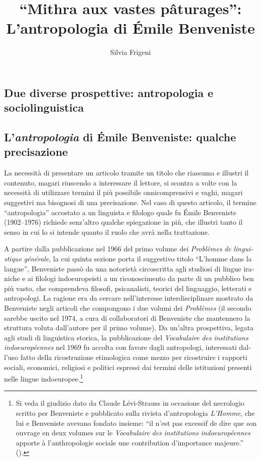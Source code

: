 \documentclass[french,output=paper,colorlinks,citecolor=brown]{../langscibook}
\author{Silvia Frigeni\affiliation{Sapienza Università di Roma, Université Sorbonne Nouvelle -- Paris 3}\orcid{}}
\title{“Mithra aux vastes pâturages”: L’antropologia di Émile Benveniste}
\begin{document}
\begin{otherlanguage}{italian}
\maketitle

\section{Due diverse prospettive: antropologia e sociolinguistica} 

\subsection{L’\textit{antropologia} di Émile Benveniste: qualche precisazione}

La necessità di presentare un articolo tramite un titolo che riassuma e illustri il contenuto, magari riuscendo a interessare il lettore, si scontra a volte con la necessità di utilizzare termini il più possibile onnicomprensivi e vaghi, magari suggestivi ma bisognosi di una precisazione. Nel caso di questo articolo, il termine “antropologia” accostato a un linguista e filologo quale fu Émile Benveniste (1902--1976) richiede senz’altro qualche spiegazione in più, che illustri tanto il senso in cui lo si intende quanto il ruolo che avrà nella trattazione. 

A partire dalla pubblicazione nel 1966 del primo volume dei \textit{Problèmes} \textit{de} \textit{linguistique} \textit{générale}, la cui quinta sezione porta il suggestivo titolo “L’homme dans la langue”, Benveniste passò da una notorietà circoscritta agli studiosi di lingue iraniche e ai filologi indoeuropeisti a un riconoscimento da parte di un pubblico ben più vasto, che comprendeva filosofi, psicanalisti, teorici del linguaggio, letterati e antropologi. La ragione era da cercare nell’interesse interdisciplinare mostrato da Benveniste negli articoli che compongono i due volumi dei \textit{Problèmes} (il secondo sarebbe uscito nel 1974, a cura di collaboratori di Benveniste che mantennero la struttura voluta dall’autore per il primo volume). Da un’altra prospettiva, legata agli studi di linguistica storica, la pubblicazione del \textit{Vocabulaire} \textit{des} \textit{institutions} \textit{indoeuropéennes} nel 1969 fu accolta con favore dagli antropologi, interessati dall’uso fatto della ricostruzione etimologica come mezzo per ricostruire i rapporti sociali, economici, religiosi e politici espressi dai termini delle istituzioni presenti nelle lingue indoeuropee.\footnote{ \textrm{Si veda il giudizio dato da Claude Lévi-Strauss in occasione del necrologio scritto per Benveniste e pubblicato sulla rivista d'antropologia} \textrm{\textit{L’Homme}}\textrm{, che lui e Benveniste avevano fondato insieme:} \textrm{“}\textrm{il n’est pas excessif de dire que son ouvrage en deux volumes sur le} \textrm{\textit{Vocabulaire} \textit{des} \textit{institutions} \textit{indoeuropéennes}} \textrm{apporte à l’anthropologie sociale une contribution d’importance majeure.}\textrm{”} \textrm{(\citealt[5]{Lévi-Strauss1976}).}}


\end{otherlanguage}
\end{document}
